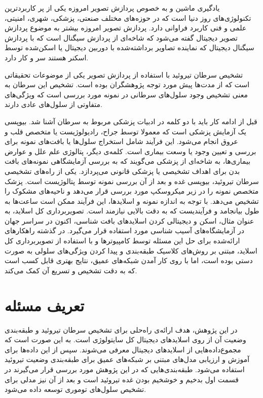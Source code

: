 
یادگیری ماشین و به خصوص پردازش تصویر امروزه یکی از پر کاربردترین تکنولوژی‌های روز دنیا است که در حوزه‌های مختلف صنعتی، پزشکی، شهری، امنیتی، علمی و فنی کاربرد فراوانی دارد.
پردازش تصویر امروزه بیشتر به موضوع پردازش تصویر دیجیتال گفته می‌شود که شاخه‌ای از پردازش سیگنال است که با پردازش سیگنال دیجیتال که نماینده تصاویر برداشته‌شده با دوربین دیجیتال یا اسکن‌شده توسط اسکنر هستند سر و کار دارد.

تشخیص سرطان تیروئید با استفاده از پردازش تصویر یکی از موضوعات تحقیقاتی است که از مدت‌ها پیش مورد توجه پژوهشگران بوده است. تشخیص این سرطان به معنی تشخیص وجود سلول‌های سرطانی در نمونه مورد بررسی است که ویژگی‌های متفاوتی از سلول‌های عادی دارند.

قبل از ادامه کار باید با دو کلمه در ادبیات پزشکی مربوط به سرطان آشنا شد.
بیوپسی یک آزمایش پزشکی است که معمولا توسط جراح، رادیولوژیست یا متخصص قلب و عروق انجام می‌شود.
این فرآیند شامل استخراج سلول‌ها یا بافت‌های نمونه برای بررسی و تعیین وجود یا وسعت بیماری است. کلمه‌ی دیگر، پتالوژی علم علل و عوارض بیماری‌ها، به شاخه‌ای از پزشکی می‌گویند که به بررسی آزمایشگاهی نمونه‌های بافت بدن برای اهداف تشخیصی یا پزشکی قانونی می‌پردازد.
یکی از راه‌های تشخیصی سرطان تیروئید، بیوپسی غده و بعد از آن بررسی نمونه توسط پتالوژیست است. پزشک متخصص نمونه را در زیر میکروسکپ مورد بررسی قرار می‌دهد و ناحیه‌های مشکوک را تشخیص می‌دهد. با توجه به اندازه نمونه و اسلاید‌ها، این فرآیند ممکن است ساعت‌ها به طول بیانجامد و فرآیندیست که به دقت بالایی نیازمند است.
تصویربرداری کل اسلاید، به عنوان مثال، اسکن و دیجیتالی کردن اسلایدهای بافت شناسی، اکنون در سراسر جهان در آزمایشگاه‌های آسیب شناسی مورد استفاده قرار می‌گیرد.
در گذشته راهکارهای ارائه‌شده برای حل این مسئله توسط کامپیوتر‌ها و با استفاده از تصویربرداری کل اسلاید، مبتنی بر روش‌های کلاسیک طبقه‌بندی و پیدا کردن ویژگی‌های سلولی به صورت دستی بوده است، اما با روی کار آمدن شبکه‌های عمیق، نتایج بهتری قابل کسب است که به دقت تشخیص و تسریع آن کمک می‌کند.

\section{تعریف مسئله}\label{sec:تعریف مسئله}
در این پژوهش، هدف ارائه‌ی راه‌حلی برای تشخیص سرطان تیروئید و طبقه‌بندی وضعیت آن از روی اسلاید‌های دیجیتال کل سایتولوژی است.
به این صورت است که مجموع‌داده‌هایی از اسلاید‌های دیجیتال معرفی می‌شوند. سپس از این داده‌ها برای آموزش و ارزیابی مدل‌های مبتنی بر شبکه‌های عمیق برای طبقه‌بندی وضعیت تیروئید استفاده می‌شود. طبقه‌بندی‌هایی که در این پژوهش مورد بررسی قرار می‌گیرند در قسمت اول بدخیم و خوشخیم بودن غده تیروئید است و بعد از آن نیز مدلی برای تشخیص سلول‌های توموری توسعه داده می‌شود.

